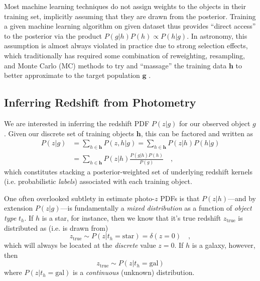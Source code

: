 \documentclass[a4paper,fleqn,usenatbib,english]{mnras}
\newcommand{\rom}[2]{\ensuremath{#1_{\mathrm{#2}}}} %
\newcommand{\pz}{photo-$z$} %
\begin{document}
Most machine learning techniques do not assign weights to the objects in their training set, implicitly assuming that they are drawn from the posterior. Training a given machine learning algorithm on given dataset thus provides ``direct access'' to the posterior via the product $P(g|h)P(h) \propto P(h|g)$. In astronomy, this assumption is almost always violated in practice due to strong selection effects, which traditionally has required some combination of reweighting, resampling, and Monte Carlo (MC) methods to try and ``massage'' the training data $\mathbf{h}$ to better approximate to the target population $\mathbf{g}$ \citep[see, e.g.,][]{lima+08}.

\subsection{Inferring Redshift from Photometry}
\label{subsec:pz_mixed}

We are interested in inferring the redshift PDF $P(z|g)$ for our observed object $g$. Given our discrete set of training objects $\mathbf{h}$, this can be factored and written as
\begin{align}
P(z|g)&=\sum_{h\in\mathbf{h}}P(z,h|g) = \sum_{h\in\mathbf{h}}P(z|h)P(h|g) \nonumber \\
&= \sum_{h\in\mathbf{h}}P(z|h)\frac{P(g|h)P(h)}{P(g)} \quad , \label{eq:pz}
\end{align}
which constitutes stacking a posterior-weighted set of underlying redshift kernels (i.e. probabilistic \textit{labels}) associated with each training object.

One often overlooked subtlety in estimate {\pz} PDFs is that $P(z|h)$---and by extension $P(z|g)$---is fundamentally a \textit{mixed distribution} as a function of \textit{object type} $t_h$. If $h$ is a star, for instance, then we know that it's true redshift $\rom{z}{true}$ is distributed as (i.e. is drawn from)
\begin{equation}
\rom{z}{true} \sim P(z|t_h=\mathrm{star}) = \delta(z=0) \quad ,
\end{equation}
which will always be located at the \textit{discrete} value $z=0$. If $h$ is a galaxy, however, then
\begin{equation}
\rom{z}{true} \sim P(z|t_h=\mathrm{gal})
\end{equation}
where $P(z|t_h=\mathrm{gal})$ is a \textit{continuous} (unknown) distribution. 
\end{document}
